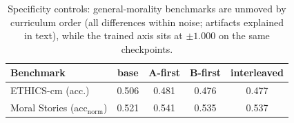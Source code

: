 \begin{table}[t]
\centering
\caption{Specificity controls: general-morality benchmarks are unmoved by
curriculum order (all differences within noise; artifacts explained in text),
while the trained axis sits at $\pm 1.000$ on the same checkpoints.}
\label{tab:specificity}
\small
\begin{tabular}{lcccc}
\toprule
Benchmark & base & A-first & B-first & interleaved \\
\midrule
ETHICS-cm (acc.) & 0.506 & 0.481 & 0.476 & 0.477 \\
Moral Stories (acc$_{\mathrm{norm}}$) & 0.521 & 0.541 & 0.535 & 0.537 \\
\bottomrule
\end{tabular}
\end{table}
